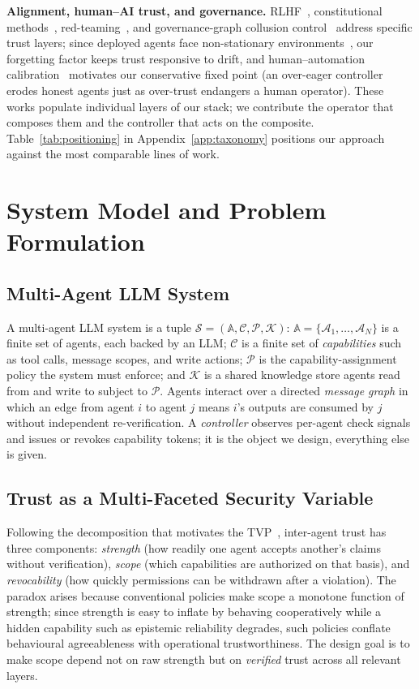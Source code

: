\documentclass[sigconf,anonymous]{acmart}
\theoremstyle{plain}
\theoremstyle{definition}
\theoremstyle{remark}
\begin{document}
\textbf{Alignment, human--AI trust, and governance.}
RLHF~\cite{christiano2017deep,ouyang2022training}, constitutional
methods~\cite{bai2022constitutional}, red-teaming~\cite{perez2022red}, and
governance-graph collusion control~\cite{instai2026} address specific trust layers; since
deployed agents face non-stationary environments~\cite{gama2014survey}, our forgetting
factor keeps trust responsive to drift, and human--automation
calibration~\cite{lee2004trust} motivates our conservative fixed point (an over-eager
controller erodes honest agents just as over-trust endangers a human operator). These
works populate individual layers of our stack; we contribute the operator that composes
them and the controller that acts on the composite. Table~\ref{tab:positioning} in
Appendix~\ref{app:taxonomy} positions our approach against the most comparable lines of
work.

\section{System Model and Problem Formulation}
\label{sec:model_system}

\subsection{Multi-Agent LLM System}
A multi-agent LLM system is a tuple $\mathcal{S}=(\mathbb{A},\mathcal{C},\mathcal{P},\mathcal{K})$:
$\mathbb{A}=\{\mathcal{A}_1,\dots,\mathcal{A}_N\}$ is a finite set of agents, each backed by
an LLM; $\mathcal{C}$ is a finite set of \emph{capabilities} such as tool calls, message
scopes, and write actions; $\mathcal{P}$ is the capability-assignment policy the system
must enforce; and $\mathcal{K}$ is a shared knowledge store agents read from and write to
subject to $\mathcal{P}$. Agents interact over a directed \emph{message graph} in which an
edge from agent $i$ to agent $j$ means $i$'s outputs are consumed by $j$ without
independent re-verification. A \emph{controller} observes per-agent check signals and
issues or revokes capability tokens; it is the object we design, everything else is given.

\subsection{Trust as a Multi-Faceted Security Variable}
Following the decomposition that motivates the TVP~\cite{qi2025trust}, inter-agent trust
has three components: \emph{strength} (how readily one agent accepts another's claims
without verification), \emph{scope} (which capabilities are authorized on that basis),
and \emph{revocability} (how quickly permissions can be withdrawn after a violation). The
paradox arises because conventional policies make scope a monotone function of strength;
since strength is easy to inflate by behaving cooperatively while a hidden capability such
as epistemic reliability degrades, such policies conflate behavioural agreeableness with
operational trustworthiness. The design goal is to make scope depend not on raw strength
but on \emph{verified} trust across all relevant layers.
\end{document}
